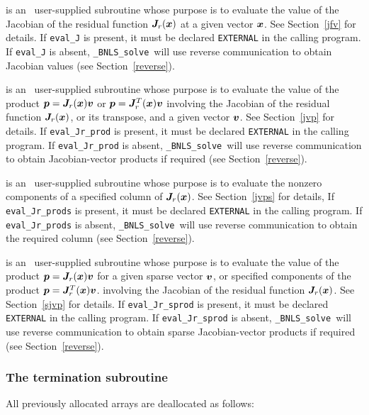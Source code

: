\documentclass{galahad}
\newcommand{\packagename}{BNLS}
\newcommand{\fullpackagename}{\libraryname\_\packagename}
\newcommand{\solver}{{\tt \fullpackagename\_solve}}
\begin{document}
\begin{description}
 is an \optional\
user-supplied subroutine whose purpose is to evaluate the value of the
Jacobian of the residual function ${\bm{J}}_r({\bm{x}})$ at a given vector ${\bm{x}}$.
See Section~\ref{jfv} for details.
If {\tt eval\_J} is present,
it must be declared {\tt EXTERNAL} in the calling program.
If {\tt eval\_J} is absent, \solver\ will use reverse communication to
obtain Jacobian values (see Section~\ref{reverse}).

 is an \optional\
user-supplied subroutine whose purpose is to evaluate the value of the product
${\bm{p}} = {\bm{J}}_r({\bm{x}}){\bm{v}}$ or ${\bm{p}} = {\bm{J}}_r^T({\bm{x}}){\bm{v}}$ involving the
Jacobian of the residual function ${\bm{J}}_r({\bm{x}})$, or its transpose, and 
a given vector ${\bm{v}}$. See Section~\ref{jvp} for details.
If {\tt eval\_Jr\_prod} is present, it must be declared {\tt EXTERNAL} in the 
calling program. If {\tt eval\_Jr\_prod} is absent, \solver\ will use 
reverse communication to obtain Jacobian-vector products if required 
(see Section~\ref{reverse}).

 is an \optional\
user-supplied subroutine whose purpose is to evaluate the nonzero
components of a specified column of  ${\bm{J}}_r({\bm{x}})$.
See Section~\ref{jvps} for details,
If {\tt eval\_Jr\_prods} is present,
it must be declared {\tt EXTERNAL} in the calling program.
If {\tt eval\_Jr\_prods} is absent, \solver\ will use reverse communication to
obtain the required column (see Section~\ref{reverse}).

\itt{eval\_Jr\_sprod} is an \optional\
user-supplied subroutine whose purpose is to evaluate the value of the product
${\bm{p}} = {\bm{J}}_r({\bm{x}}){\bm{v}}$ for a given sparse vector ${\bm{v}}$, or specified
components of the product ${\bm{p}} = {\bm{J}}_r^T({\bm{x}}){\bm{v}}$. involving the
Jacobian of the residual function ${\bm{J}}_r({\bm{x}})$.
See Section~\ref{sjvp} for details.
If {\tt eval\_Jr\_sprod} is present, it must be declared {\tt EXTERNAL} in the 
calling program. If {\tt eval\_Jr\_sprod} is absent, \solver\ will use 
reverse communication to obtain sparse Jacobian-vector products if required 
(see Section~\ref{reverse}).

\end{description}


\subsubsection{The  termination subroutine}
All previously allocated arrays are deallocated as follows:
\vspace*{1mm}
\end{document}

